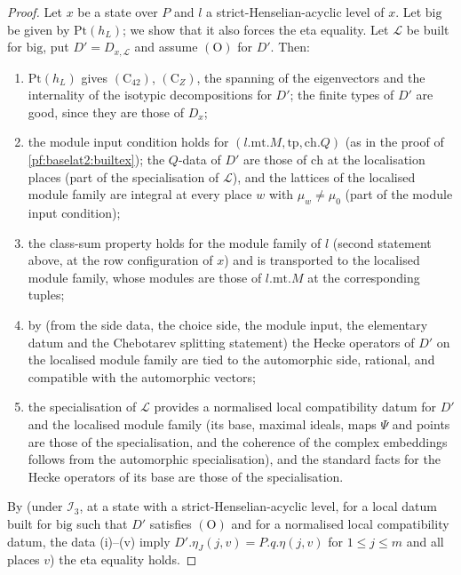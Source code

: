 \begin{proof}
Let $x$ be a state over $P$ and $l$ a strict-Henselian-acyclic level of $x$. Let $\mathrm{big}$ be given by
$\mathrm{Pt}(h_L)$; we show that it also forces the eta equality. Let $\mathcal L$ be built for $\mathrm{big}$, put
$D'=D_{x,\mathcal L}$ and assume $(\mathrm{O})$ for $D'$. Then:
\begin{enumerate}[label=(\roman*)]
\item $\mathrm{Pt}(h_L)$ gives $(\mathrm{C}_{42})$, $(\mathrm{C}_Z)$, the spanning of the eigenvectors and the internality of
  the isotypic decompositions for $D'$; the finite types of $D'$ are good, since they are those of $D_x$;
\item the module input condition holds for $(l.\mathrm{mt}.M,\mathrm{tp},\mathrm{ch}.Q)$ (as in the proof of
  \cref{pf:baselat2:builtex}); the $Q$-data of $D'$ are those of $\mathrm{ch}$ at the localisation places (part of
  the specialisation of $\mathcal L$), and the lattices of the localised module family are integral at every
  place $w$ with $\mu_w\ne\mu_0$ (part of the module input condition);
\item the class-sum property holds for the module family of $l$ (second statement above, at the row
  configuration of $x$) and is transported to the localised module family, whose modules are those of
  $l.\mathrm{mt}.M$ at the corresponding tuples;
\item by  (from the side data, the choice side, the
  module input, the elementary datum and the Chebotarev splitting statement) the Hecke operators of $D'$ on
  the localised module family are tied to the automorphic side, rational, and compatible with the
  automorphic vectors;
\item the specialisation of $\mathcal L$ provides a normalised local compatibility datum for
  $D'$ and the localised module family (its base, maximal ideals, maps $\Psi$ and points are those of the
  specialisation, and the coherence of the complex embeddings follows from the automorphic specialisation), and
  the standard facts for the Hecke operators of its base are those of the specialisation.
\end{enumerate}
By  (under $\mathcal I_3$, at a state with a
strict-Henselian-acyclic level, for a local datum built for $\mathrm{big}$ such that $D'$ satisfies $(\mathrm{O})$
and for a normalised local compatibility datum, the data (i)--(v) imply $D'.\eta_J(j,v)=P.q.\eta(j,v)$ for
$1\le j\le m$ and all places $v$) the eta equality holds.
\end{proof}

